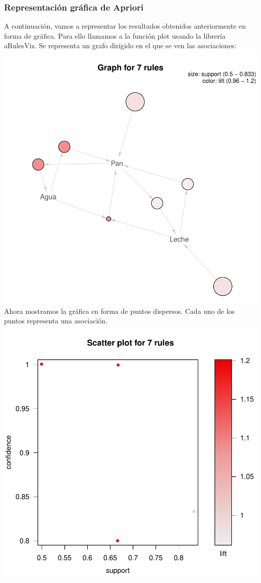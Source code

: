 \documentclass [a4paper] {article}
\begin{document}
\subsubsection{Representación gráfica de Apriori}
A continuación, vamos a representar los resultados obtenidos anteriormente en forma de gráfica. Para ello llamamos a la función plot usando la librería aRulesViz.
Se representa un grafo dirigido en el que se ven las asociaciones:
\newline
\includegraphics{Memoria-Figura 1}
\newline
Ahora mostramos la gráfica en forma de puntos dispersos. Cada uno de los puntos representa una asociación.
\newline
\includegraphics{Memoria-Figura 2}
\end{document}

